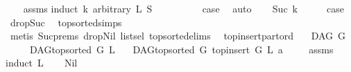 \begin{isabellebody}
%
\isadelimproof
\ \ %
\endisadelimproof
%
\isatagproof
{}\isamarkupfalse%
\ assms\isanewline
{}\isamarkupfalse%
{\isacharparenleft}{\kern0pt}induct\ k\ arbitrary{\isacharcolon}{\kern0pt}\ L\ S{\isacharparenright}{\kern0pt}\isanewline
\ \ \isamarkupfalse%
\ {}\isanewline
\ \ \isamarkupfalse%
\ \isamarkupfalse%
\ {\isacharquery}{\kern0pt}case\ \isamarkupfalse%
\ auto\isanewline
{}\isamarkupfalse%
\isanewline
\ \ \isamarkupfalse%
\ {\isacharparenleft}{\kern0pt}Suc\ k{\isacharparenright}{\kern0pt}\isanewline
\ \ \isamarkupfalse%
\ \isamarkupfalse%
\ {\isacharquery}{\kern0pt}case\ \isamarkupfalse%
\ drop{\isacharunderscore}{\kern0pt}Suc\ \isamarkupfalse%
\ top{\isacharunderscore}{\kern0pt}sorted{\isachardot}{\kern0pt}simps\isanewline
\ \ \ \ \isamarkupfalse%
\ {\isacharparenleft}{\kern0pt}metis\ Suc{\isachardot}{\kern0pt}prems{\isacharparenleft}{\kern0pt}{}{\isacharparenright}{\kern0pt}\ drop{\isacharunderscore}{\kern0pt}Nil\ list{\isachardot}{\kern0pt}sel{\isacharparenleft}{\kern0pt}{}{\isacharparenright}{\kern0pt}\ top{\isacharunderscore}{\kern0pt}sorted{\isachardot}{\kern0pt}elims{\isacharparenleft}{\kern0pt}{}{\isacharparenright}{\kern0pt}{\isacharparenright}{\kern0pt}\ \isanewline
{}\isamarkupfalse%
%
\endisatagproof
{\isafoldproof}%
%
\isadelimproof
\isanewline
%
\endisadelimproof
\isanewline
\isanewline
{}\isamarkupfalse%
\ top{\isacharunderscore}{\kern0pt}insert{\isacharunderscore}{\kern0pt}part{\isacharunderscore}{\kern0pt}ord{\isacharcolon}{\kern0pt}\isanewline
\ \ \ {\isachardoublequoteopen}DAG\ G{\isachardoublequoteclose}\isanewline
\ \ \ \ \ {\isachardoublequoteopen}DAG{\isachardot}{\kern0pt}top{\isacharunderscore}{\kern0pt}sorted\ G\ L{\isachardoublequoteclose}\isanewline
\ \ \ {\isachardoublequoteopen}DAG{\isachardot}{\kern0pt}top{\isacharunderscore}{\kern0pt}sorted\ G\ {\isacharparenleft}{\kern0pt}top{\isacharunderscore}{\kern0pt}insert\ G\ L\ a{\isacharparenright}{\kern0pt}{\isachardoublequoteclose}\ \isanewline
%
\isadelimproof
\ \ %
\endisadelimproof
%
\isatagproof
{}\isamarkupfalse%
\ assms\ \isanewline
{}\isamarkupfalse%
{\isacharparenleft}{\kern0pt}induct\ L{\isacharparenright}{\kern0pt}\isanewline
\ \ \isamarkupfalse%
\ Nil\isanewline
\ \ \isamarkupfalse%

\end{isabellebody}
